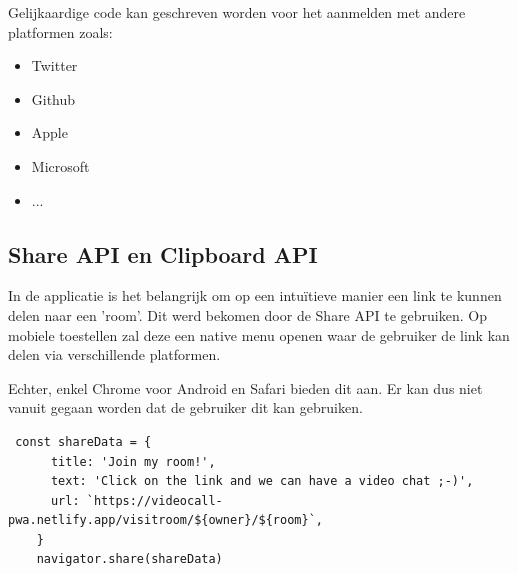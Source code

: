 		Gelijkaardige code kan geschreven worden voor het aanmelden met andere platformen zoals:
		\begin{itemize}
			\item Twitter
			\item Github
			\item Apple
			\item Microsoft
			\item ...
		\end{itemize} 
		
	\subsection{Share API en Clipboard API}
	
		In de applicatie is het belangrijk om op een intuïtieve manier een link te kunnen delen naar een 'room'. 
		Dit werd bekomen door de Share API te gebruiken.
		Op mobiele toestellen zal deze een native menu openen waar de gebruiker de link kan delen via verschillende platformen.
		
		Echter, enkel Chrome voor Android en Safari bieden dit aan. Er kan dus niet vanuit gegaan worden dat de gebruiker dit kan gebruiken.

\begin{lstlisting}
 const shareData = {
      title: 'Join my room!',
      text: 'Click on the link and we can have a video chat ;-)',
      url: `https://videocall-pwa.netlify.app/visitroom/${owner}/${room}`,
    }
    navigator.share(shareData)
\end{lstlisting}

